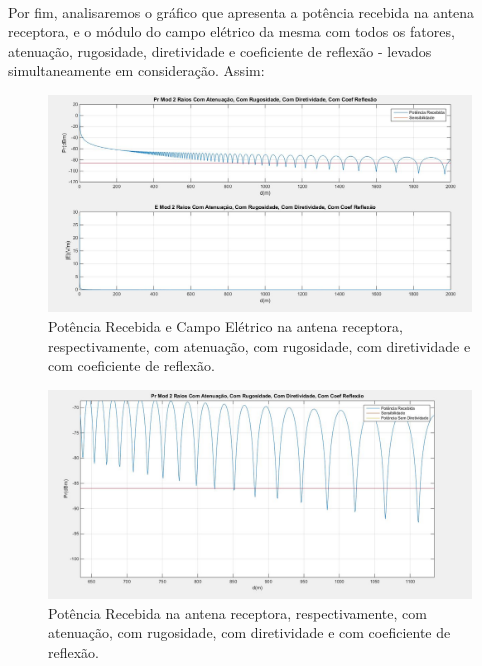 \paragraph{}Por fim, analisaremos o gráfico que apresenta a potência recebida na antena receptora, e o módulo do campo elétrico da mesma com todos os fatores, atenuação, rugosidade, diretividade e coeficiente de reflexão - levados simultaneamente em consideração. Assim:

\FloatBarrier
\begin{figure}[!htp]
\centering
\includegraphics[scale = 0.3]{Figuras/CA_CR_CD_CCR.JPG}
\caption{Potência Recebida e Campo Elétrico na antena receptora, respectivamente, com atenuação, com rugosidade, com diretividade e com coeficiente de reflexão.}
\label{completo_1}
\end{figure}
\FloatBarrier

\FloatBarrier
\begin{figure}[!htp]
\centering
\includegraphics[scale = 0.3]{Figuras/CA_CR_CD_CCR_2.JPG}
\caption{Potência Recebida na antena receptora, respectivamente, com atenuação, com rugosidade, com diretividade e com coeficiente de reflexão.}
\label{completo_2}
\end{figure}
\FloatBarrier

